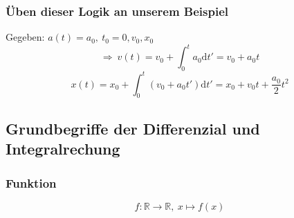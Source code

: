 \documentclass[11pt]{article}
\begin{document}
\subsubsection{Üben dieser Logik an unserem Beispiel}
\label{sec-1-1-2}
Gegeben: $a(t) = a_0,~t_0=0,v_0,x_0$ \\
    \[\Rightarrow~v(t) = v_0 + \int_0^t a_0\mathrm{d}t' = v_0 + a_0 t\]
\[x(t) = x_0 + \int_0^t (v_0 + a_0 t')\mathrm{d}t' = x_0 + v_0 t + \frac{a_0}{2}t^2\]
\subsection{Grundbegriffe der Differenzial und Integralrechung}
\label{sec-1-2}
\subsubsection{Funktion}
\label{sec-1-2-1}
\[f: \mathbb{R} \rightarrow \mathbb{R},~x \mapsto f(x)\]
\end{document}
